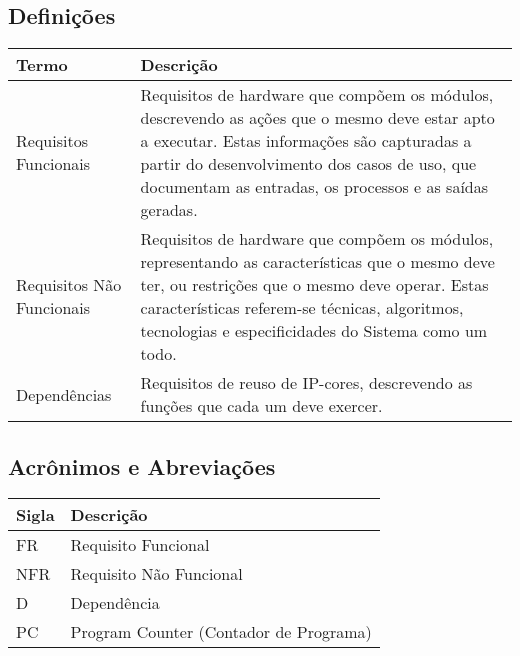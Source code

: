 \documentclass{article}
\begin{document}
  \subsection{Definições}
    \FloatBarrier
    \begin{table}[H]
      \begin{center}
        \begin{tabular}[pos]{|m{5cm} | m{9cm}|}
          \hline
          \cellcolor[gray]{0.9}\textbf{Termo} & \cellcolor[gray]{0.9}\textbf{Descrição} \\ \hline
          Requisitos Funcionais & Requisitos de hardware que compõem os módulos, descrevendo as ações que o mesmo deve estar apto a executar. Estas informações são capturadas a partir do desenvolvimento dos casos de uso, que documentam as entradas, os processos e as saídas geradas.  \\ \hline
          Requisitos Não Funcionais & Requisitos de hardware que compõem os módulos, representando as características que o mesmo deve ter, ou restrições que o mesmo deve operar. Estas características referem-se técnicas, algoritmos, tecnologias e especificidades do Sistema como um todo.  \\ \hline
          Dependências & Requisitos de reuso de IP-cores, descrevendo as funções que cada um deve exercer. \\ \hline
        \end{tabular}
      \end{center}
    \end{table}

  \subsection{Acrônimos e Abreviações}
    \FloatBarrier
    \begin{table}[H]
      \begin{center}
        \begin{tabular}[pos]{|m{2cm} | m{12cm}|}
          \hline
          \cellcolor[gray]{0.9}\textbf{Sigla} & \cellcolor[gray]{0.9}\textbf{Descrição} \\ \hline
          FR      & Requisito Funcional  \\ \hline
          NFR     & Requisito Não Funcional  \\ \hline
          D       & Dependência  \\ \hline
          PC      & Program Counter (Contador de Programa)  \\ \hline
        \end{tabular}
      \end{center}
    \end{table}
\end{document}
